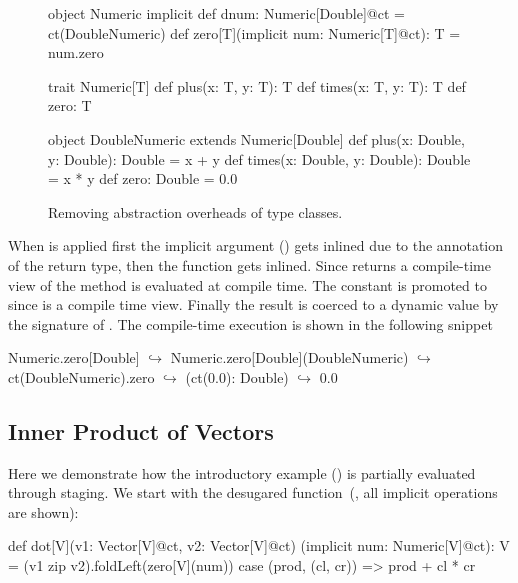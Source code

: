 \begin{figure}
\begin{listing}
object Numeric {
  implicit def dnum: Numeric[Double]@ct =
    ct(DoubleNumeric)
  def zero[T](implicit num: Numeric[T]@ct): T =
    num.zero
}

trait Numeric[T] {
  def plus(x: T, y: T): T
  def times(x: T, y: T): T
  def zero: T
}

object DoubleNumeric extends Numeric[Double] {
  def plus(x: Double, y: Double): Double = x + y
  def times(x: Double, y: Double): Double = x * y
  def zero: Double = 0.0
}
\end{listing}
\caption{\label{fig:numeric} Removing abstraction overheads of type classes.}
\end{figure}

When  is applied first the implicit argument () gets
inlined due to the  annotation of the return type, then the function  gets
inlined. Since  returns a compile-time view of 
the method  is evaluated at compile time. The constant  is
promoted to  since  is a compile time view. Finally the  result
is coerced to a dynamic value by the signature of . The
compile-time execution is shown in the following snippet

\begin{lstparagraph}
Numeric.zero[Double]
  $\hookrightarrow$ Numeric.zero[Double](DoubleNumeric)
  $\hookrightarrow$ ct(DoubleNumeric).zero
  $\hookrightarrow$ (ct(0.0): Double)
  $\hookrightarrow$ 0.0
\end{lstparagraph}

\subsection{Inner Product of Vectors}
\label{sct:dot-product}

Here we demonstrate how the introductory example () is
partially evaluated through staging. We start with the desugared 
function~(\ie, all implicit operations are shown):

\begin{lstparagraph}
 def dot[V](v1: Vector[V]@ct, v2: Vector[V]@ct)
  (implicit num: Numeric[V]@ct): V =
  (v1 zip v2).foldLeft(zero[V](num)) {
    case (prod, (cl, cr)) => prod + cl * cr
  }
\end{lstparagraph}

